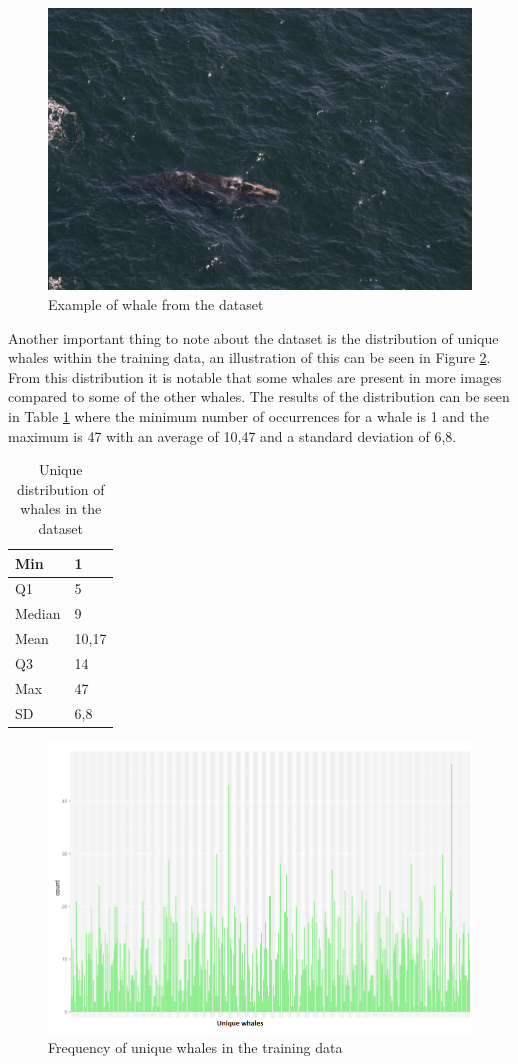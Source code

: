 \begin{figure}
	\centering
	\includegraphics[width=\linewidth]{Images/w_7489}
	\caption{Example of whale from the dataset}
	\label{fig:whale-example}
\end{figure}

Another important thing to note about the dataset is the distribution of unique whales within the training data, an illustration of this can be seen in Figure \ref{fig:whale-frequency}. From this distribution it is notable that some whales are present in more images compared to some of the other whales. The results of the distribution can be seen in Table \ref{table:whale-distribution} where the minimum number of occurrences for a whale is 1 and the maximum is 47 with an average of 10,47 and a standard deviation of 6,8.

\begin{table}
	\centering
	\caption{Unique distribution of whales in the dataset}
	\label{table:whale-distribution}
	\begin{tabularx}{\linewidth}{|X|X|}
		\hline
		Min    & 1     \\ \hline
		Q1     & 5     \\ \hline
		Median & 9     \\ \hline
		Mean   & 10,17 \\ \hline
		Q3     & 14    \\ \hline
		Max    & 47    \\ \hline
		SD     & 6,8   \\ \hline
	\end{tabularx}
\end{table}

\begin{figure}
	\centering
	\includegraphics[width=\linewidth]{Images/FrequencyPlot}
	\caption{Frequency of unique whales in the training data}
	\label{fig:whale-frequency}
\end{figure}	